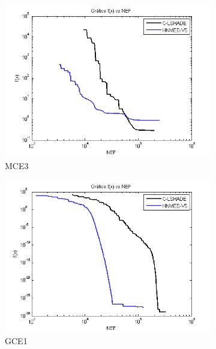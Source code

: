 \begin{figure}
\begin{subfigure}[b]{0.49\linewidth}
		\includegraphics[width=\linewidth]{Figures/E-Grafica_Convergencia_Problema_3}
		\caption{MCE3} \label{fig:M3} 
	\end{subfigure}
	\begin{subfigure}[b]{0.49\linewidth}
		\includegraphics[width=\linewidth]{Figures/E-Grafica_Convergencia_Problema_4}
		\caption{GCE1} \label{fig:G1} 
	\end{subfigure}
	\begin{subfigure}[b]{0.49\linewidth}

\end{subfigure}
\end{figure}
